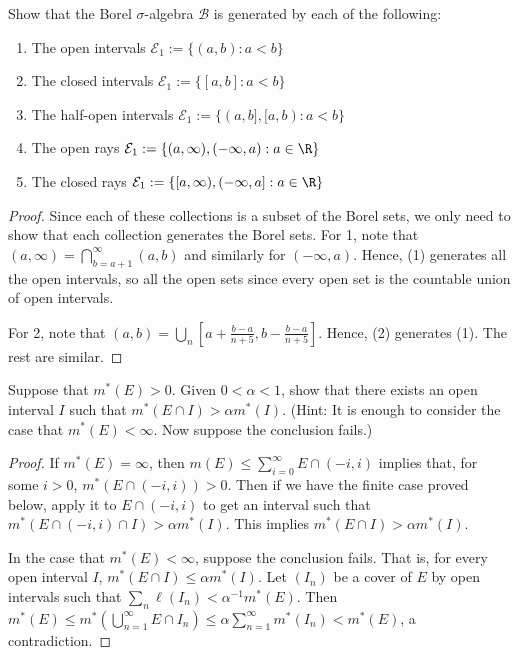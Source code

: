  Show that the Borel $\sigma$-algebra $\mathcal{B}$ is generated by each of the following:
\begin{enumerate}
\item The open intervals $\mathcal{E}_1 := \{(a,b) : a < b\}$
\item The closed intervals $\mathcal{E}_1 := \{[a,b] : a < b\}$
\item The half-open intervals $\mathcal{E}_1 := \{(a,b], [a,b) : a < b\}$
\item The open rays $\mathcal{E}_1 := \{(a,\infty), (-\infty,a) : a \in \R\}$
\item The closed rays $\mathcal{E}_1 := \{[a,\infty), (-\infty,a] : a \in \R\}$
\end{enumerate}
\begin{proof}
Since each of these collections is a subset of the Borel sets, we only need to show that each collection generates the Borel sets. For 1, note that $(a, \infty) = \bigcap_{b=a+1}^\infty (a,b)$ and similarly for $(-\infty, a)$. Hence, (1) generates all the open intervals, so all the open sets since every open set is the countable union of open intervals.

For 2, note that $(a,b) = \bigcup_n [a + \frac{b-a} {n+5}, b - \frac{b-a}{n+5}]$. Hence, (2) generates (1). The rest are similar.
\end{proof}

 Suppose that $m^*(E) > 0$. Given $0 < \alpha < 1$, show that there exists an open interval $I$ such that $m^*(E \cap I) > \alpha m^*(I)$. (Hint: It is enough to consider the case that $m^*(E) < \infty$. Now suppose the conclusion fails.)
\begin{proof}
If $m^*(E) = \infty$, then $m(E) \leq \sum_{i=0}^\infty E \cap (-i, i)$ implies that, for some $i > 0$, $m^*(E \cap (-i,i)) > 0$.  Then if we have the finite case proved below, apply it to $E \cap (-i,i)$ to get an interval such that $m^*(E \cap (-i,i) \cap I)  > \alpha m^*(I)$. This implies $m^*(E \cap I) > \alpha m^*(I)$.

In the case that $m^*(E) < \infty$, suppose the conclusion fails. That is, for every open interval $I$, $m^*(E \cap I) \leq \alpha m^*(I)$. Let $(I_n)$ be a cover of $E$ by open intervals such that $\sum_n \ell(I_n) < \alpha^{-1} m^*(E)$. Then $m^*(E) \leq m^*(\bigcup_{n=1}^\infty E \cap I_n) \leq \alpha \sum_{n=1}^\infty m^*(I_n) < m^*(E)$, a contradiction.

\end{proof}

